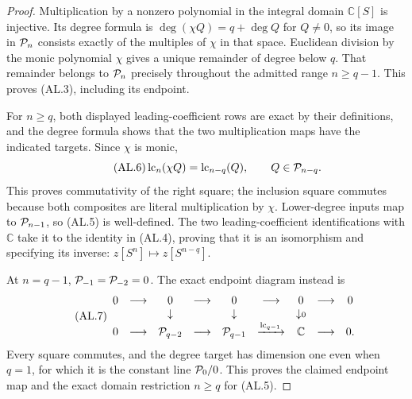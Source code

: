 \begin{proof}
Multiplication by a nonzero polynomial in the integral domain $\mathbb C[S]$
is injective. Its degree formula is
$\deg(\chi Q)=q+\deg Q$ for $Q\ne0$, so its image in $\mathcal P_n$ consists
exactly of the multiples of $\chi$ in that space. Euclidean division by the
monic polynomial $\chi$ gives a unique remainder of degree below $q$.
That remainder belongs to $\mathcal P_n$ precisely throughout the admitted range
$n\ge q-1$. This proves (AL.3), including its endpoint.

For $n\ge q$, both displayed leading-coefficient rows are exact by their
definitions, and the degree formula shows that the two multiplication maps
have the indicated targets. Since $\chi$ is monic,
\begin{equation}\tag{AL.6}
 \operatorname{lc}_n(\chi Q)=\operatorname{lc}_{n-q}(Q),
 \qquad Q\in\mathcal P_{n-q}.
\end{equation}
This proves commutativity of the right square; the inclusion square commutes
because both composites are literal multiplication by $\chi$. Lower-degree
inputs map to $\mathcal P_{n-1}$, so (AL.5) is well-defined. The two
leading-coefficient identifications with $\mathbb C$ take it to the identity
in (AL.4), proving that it is an isomorphism and specifying its inverse:
$z[S^n]\mapsto z[S^{n-q}]$.

At $n=q-1$, $\mathcal P_{-1}=\mathcal P_{-2}=0$. The exact endpoint diagram instead is
\begin{equation}\tag{AL.7}
\begin{array}{ccccccccc}
0&\longrightarrow&0&\longrightarrow&0&\longrightarrow&0
 &\longrightarrow&0\\
 &&\downarrow&&\downarrow&&\downarrow\scriptstyle 0&&\\
0&\longrightarrow&\mathcal P_{q-2}&\longrightarrow&\mathcal P_{q-1}
 &\xrightarrow{\operatorname{lc}_{q-1}}&\mathbb C&\longrightarrow&0.
\end{array}
\end{equation}
Every square commutes, and the degree target has dimension one even when
$q=1$, for which it is the constant line $\mathcal P_0/0$. This proves the claimed
endpoint map and the exact domain restriction $n\ge q$ for (AL.5).
\end{proof}

